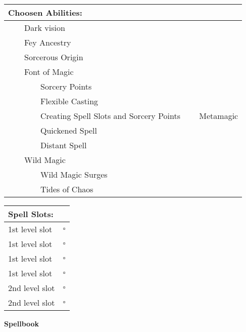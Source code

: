 \documentclass[11pt]{article}
\newcommand{\available}{$\square$}
\newcommand{\tabitem}{~~\llap{--}~~}
\newcommand{\tabtabitem}{~~~~~~\llap{$\bullet$}~~}
\begin{document}
\begin{multicols}{2}
\noindent \begin{tabularx}{95mm}{@{}l}
{\Large \textbf{Choosen Abilities:}} \\
\hline
\tabitem Dark vision \\
\tabitem Fey Ancestry \\
\tabitem Sorcerous Origin \\
\tabitem Font of Magic \\
\tabtabitem Sorcery Points \\
\tabtabitem Flexible Casting \\
\tabtabitem Creating Spell Slots and Sorcery Points
\tabitem Metamagic \\
\tabtabitem Quickened Spell \\
\tabtabitem Distant Spell \\
\tabitem Wild Magic \\
\tabtabitem Wild Magic Surges \\
\tabtabitem Tides of Chaos
		\end{tabularx}

\vspace{4mm}

\noindent \begin{tabularx}{95mm}{@{}l c}
{\Large \textbf{Spell Slots:}} & \\
\hline
1st level slot & \available \\
1st level slot & \available \\
1st level slot & \available \\
1st level slot & \available \\
2nd level slot & \available \\
2nd level slot & \available
		\end{tabularx}
	\end{multicols}

\clearpage

	\begin{center}
{\LARGE \textbf{Spellbook}}
	\end{center}
\end{document}
